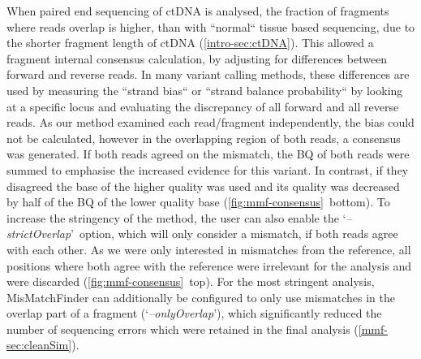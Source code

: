 When paired end sequencing of ctDNA is analysed, the fraction of fragments where reads overlap is higher, than with ``normal`` tissue based sequencing, due to the shorter fragment length of ctDNA (\autoref{intro-sec:ctDNA}). This allowed a fragment internal consensus calculation, by adjusting for differences between forward and reverse reads. In many variant calling methods, these differences are used by measuring the ``strand bias`` \cite{Guo2012, Saunders2012, GATKTeam2019} or ``strand balance probability`` \cite{Garrison2012} by looking at a specific locus and evaluating the discrepancy of all forward and all reverse reads. As our method examined each read/fragment independently, the bias could not be calculated, however in the overlapping region of both reads, a consensus was generated. If both reads agreed on the mismatch, the BQ of both reads were summed to emphasise the increased evidence for this variant. In contrast, if they disagreed the base of the higher quality was used and its quality was decreased by half of the BQ of the lower quality base (\autoref{fig:mmf-consensus}~bottom). To increase the stringency of the method, the user can also enable the \lq\emph{--strictOverlap}\rq\ option, which will only consider a mismatch, if both reads agree with each other. As we were only interested in mismatches from the reference, all positions where both agree with the reference were irrelevant for the analysis and were discarded (\autoref{fig:mmf-consensus}~top). For the most stringent analysis, MisMatchFinder can additionally be configured to only use mismatches in the overlap part of a fragment (\lq\emph{--onlyOverlap}\rq), which significantly reduced the number of sequencing errors which were retained in the final analysis (\autoref{mmf-sec:cleanSim}).

